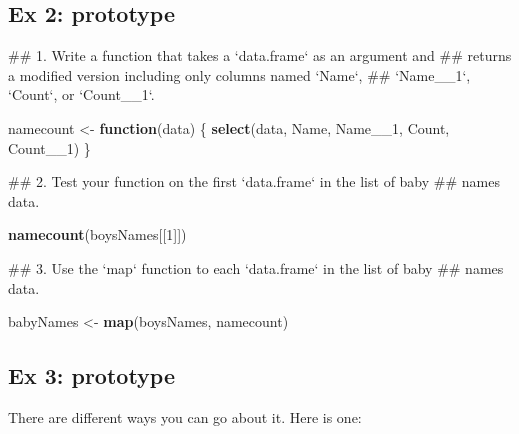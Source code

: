 \documentclass[]{book}
\newenvironment{Shaded}{\begin{snugshade}}{\end{snugshade}}
\newcommand{\KeywordTok}[1]{\textcolor[rgb]{0.13,0.29,0.53}{\textbf{#1}}}
\newcommand{\DecValTok}[1]{\textcolor[rgb]{0.00,0.00,0.81}{#1}}
\newcommand{\StringTok}[1]{\textcolor[rgb]{0.31,0.60,0.02}{#1}}
\newcommand{\ControlFlowTok}[1]{\textcolor[rgb]{0.13,0.29,0.53}{\textbf{#1}}}
\newcommand{\NormalTok}[1]{#1}
\begin{document}
\subsection{Ex 2: prototype}\label{ex-2-prototype-2}

\begin{Shaded}
\begin{Highlighting}[]
\NormalTok{  ## 1. Write a function that takes a `data.frame` as an argument and}
\NormalTok{  ##    returns a modified version including only columns named `Name`,}
\NormalTok{  ##    `Name__1`, `Count`, or `Count__1`.}

\NormalTok{  namecount <-}\StringTok{ }\ControlFlowTok{function}\NormalTok{(data) \{}
      \KeywordTok{select}\NormalTok{(data, Name, Name__}\DecValTok{1}\NormalTok{, Count, Count__}\DecValTok{1}\NormalTok{)}
\NormalTok{  \}}
     
\NormalTok{  ## 2. Test your function on the first `data.frame` in the list of baby}
\NormalTok{  ##    names data.}

  \KeywordTok{namecount}\NormalTok{(boysNames[[}\DecValTok{1}\NormalTok{]])}
  
\NormalTok{  ## 3. Use the `map` function to each `data.frame` in the list of baby}
\NormalTok{  ##    names data.}

\NormalTok{  babyNames <-}\StringTok{ }\KeywordTok{map}\NormalTok{(boysNames, namecount)}
\end{Highlighting}
\end{Shaded}

\subsection{Ex 3: prototype}\label{ex-3-prototype-2}

There are different ways you can go about it. Here is one:
\end{document}
